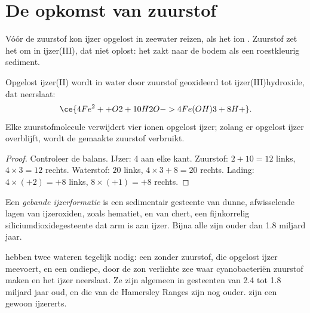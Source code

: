 \section{De opkomst van zuurstof}

Vóór de zuurstof kon ijzer opgelost in zeewater reizen, als het ion
. Zuurstof zet het om in ijzer(III), dat niet oplost: het zakt
naar de bodem als een roestkleurig sediment.

\begin{proposition}\label{prop:g12:early-earth:iron}
Opgelost ijzer(II) wordt in water door zuurstof geoxideerd tot ijzer(III)hydroxide,
dat neerslaat:
\[
  \ce{4Fe^2+ + O2 + 10H2O -> 4Fe(OH)3 + 8H+} .
\]
Elke zuurstofmolecule verwijdert vier ionen opgelost ijzer; zolang er
opgelost ijzer overblijft, wordt de gemaakte zuurstof verbruikt.
\end{proposition}

\begin{proof}
Controleer de balans. IJzer: 4 aan elke kant. Zuurstof: $2 + 10 = 12$ links,
$4 \times 3 = 12$ rechts. Waterstof: $20$ links, $4 \times 3 + 8 =
20$ rechts. Lading: $4 \times (+2) = +8$ links, $8 \times (+1) =
+8$ rechts.
\end{proof}

\begin{definition}\label{def:g12:early-earth:bif}
Een \emph{gebande ijzerformatie} is een
sedimentair gesteente van dunne, afwisselende lagen van ijzeroxiden, zoals
hematiet, en van chert, een fijnkorrelig siliciumdioxidegesteente dat arm is aan ijzer. Bijna alle zijn
ouder dan 1.8 miljard jaar.
\end{definition}

 hebben twee wateren tegelijk nodig: een  zonder zuurstof,
die opgelost ijzer meevoert, en een ondiepe, door de zon verlichte zee waar cyanobacteriën
zuurstof maken en het ijzer neerslaat. Ze zijn algemeen in gesteenten van 2.4 tot
1.8 miljard jaar oud, en die van de Hamersley Ranges zijn nog ouder.
 zijn een gewoon ijzererts.

